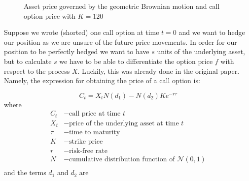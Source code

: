 \documentclass[times, utf8, diplomski]{fer}
\begin{document}
\begin{figure}[ht]
\centering

\caption{Asset price governed by the geometric Brownian motion and call option price with $K=120$}
\label{fig:gbm_price_process}	
\end{figure}
\noindent Suppose we wrote (shorted) one call option at time $t=0$ and we want to hedge our position as we are unsure of the future price movements. In order for our position to be perfectly hedged we want to have $s$ units of the underlying asset, but to calculate $s$ we have to be able to differentiate the option price $f$ with respect to the process $X$. Luckily, this was already done in the original \cite{black_pricing_1972} paper. Namely, the expression for obtaining the price of a call option is:

\begin{equation} \label{eqn:bs_call}
	C_t = X_tN(d_1) - N(d_2)Ke^{-r\tau}
\end{equation}
where
\begin{align*}
	C_t &- \mbox{call price at time } t \\
	X_t &- \mbox{price of the underlying asset at time } t \\
	\tau &- \mbox{time to maturity} \\
	K &- \mbox{strike price} \\
	r &- \mbox{risk-free rate} \\
	N &- \mbox{cumulative distribution function of } \mathcal{N}(0,1) \\
\end{align*}
and the terms $d_1$ and $d_2$ are
\end{document}
